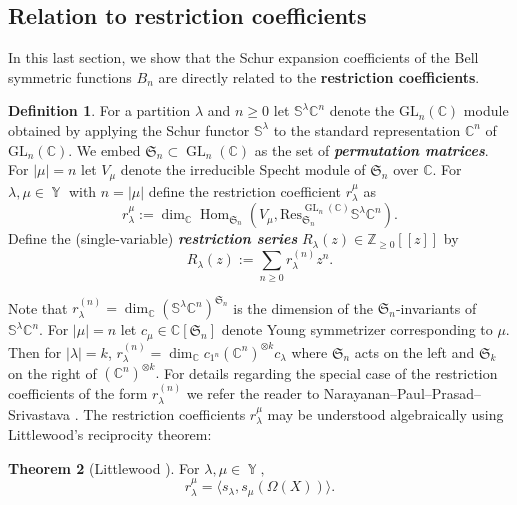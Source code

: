\documentclass[12pt,reqno]{amsart}
\theoremstyle{definition}
\newtheorem{thm}{Theorem}[section]
\newtheorem{defn}[thm]{Definition}
\DeclareMathOperator{\Par}{\mathbb{Y}}
\DeclareMathOperator{\GL}{\mathrm{GL}}
\DeclareMathOperator{\Hom}{\mathrm{Hom}}
\begin{document}
\subsection{Relation to restriction coefficients}

In this last section, we show that the Schur expansion coefficients of the Bell symmetric functions $B_n$ are directly related to the \textbf{restriction coefficients}. 

\begin{defn}
For a partition $\lambda$ and $n \geq 0$ let $\mathbb{S}^{\lambda}\mathbb{C}^n$ denote the $\mathrm{GL}_{n}(\mathbb{C})$ module obtained by applying the Schur functor $\mathbb{S}^{\lambda}$ to the standard representation $\mathbb{C}^n$ of $\mathrm{GL}_{n}(\mathbb{C})$. We embed $\mathfrak{S}_n \subset \GL_n(\mathbb{C})$ as the set of \textit{\textbf{permutation matrices}}. For $|\mu| = n$ let $V_{\mu}$ denote the irreducible Specht module of $\mathfrak{S}_n$ over $\mathbb{C}$. For $\lambda,\mu \in \Par$ with $n = |\mu|$ define the restriction coefficient $r_{\lambda}^{\mu}$ as 
    $$r_{\lambda}^{\mu}:= \dim_{\mathbb{C}} \Hom_{\mathfrak{S}_n}\left( V_{\mu} , \mathrm{Res}^{\GL_n(\mathbb{C})}_{\mathfrak{S}_n} \mathbb{S}^{\lambda} \mathbb{C}^n \right).$$ Define the (single-variable) \textit{\textbf{restriction series}} $R_{\lambda}(z) \in \mathbb{Z}_{\geq 0}[[z]]$ by 
    $$R_{\lambda}(z):= \sum_{n \geq 0} r_{\lambda}^{(n)}z^{n}.$$
\end{defn}

Note that $r_{\lambda}^{(n)} = \dim_{\mathbb{C}} \left( \mathbb{S}^{\lambda} \mathbb{C}^n \right)^{\mathfrak{S}_n}$ is the dimension of the $\mathfrak{S}_n$-invariants of $\mathbb{S}^{\lambda} \mathbb{C}^n.$ For $|\mu| = n$ let $c_{\mu} \in \mathbb{C}[\mathfrak{S}_{n}]$ denote Young symmetrizer corresponding to $\mu$. Then for $|\lambda| = k$, $r_{\lambda}^{(n)} = \dim_{\mathbb{C}} c_{1^n} (\mathbb{C}^n)^{\otimes k} c_{\lambda}$ where $\mathfrak{S}_{n}$ acts on the left and $\mathfrak{S}_{k}$ on the right of $(\mathbb{C}^n)^{\otimes k}.$ For details regarding the special case of the restriction coefficients of the form $r_{\lambda}^{(n)}$ we refer the reader to Narayanan--Paul--Prasad--Srivastava \cite{NSPP21}. The restriction coefficients $r_{\lambda}^{\mu}$ may be understood algebraically using Littlewood's reciprocity theorem:

\begin{thm}[Littlewood \cite{Littlewood58}]\label{tauberian thm}
For $\lambda,\mu \in \Par,$
    $$r_{ \lambda}^{\mu} = \langle s_{\lambda},s_{\mu}(\Omega(X)) \rangle.$$
\end{thm}
\end{document}
